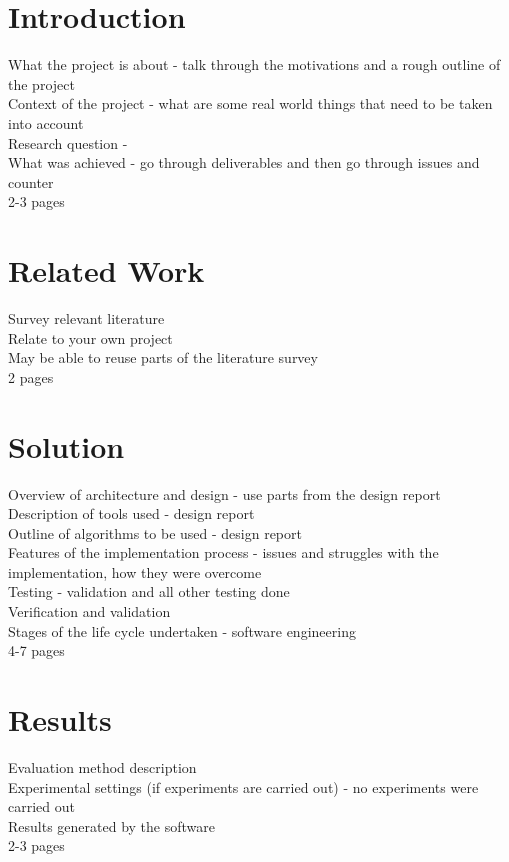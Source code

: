 \documentclass[12pt,a4paper]{article}
\begin{document}
\section{Introduction}

What the project is about - talk through the motivations and a rough outline of the project\\
Context of the project - what are some real world things that need to be taken into account\\
Research question - \\
What was achieved - go through deliverables and then go through issues and counter\\
2-3 pages

\section{Related Work}

Survey relevant literature\\
Relate to your own project\\
May be able to reuse parts of the literature survey\\
2 pages

\section{Solution}

Overview of architecture and design - use parts from the design report\\
Description of tools used - design report\\
Outline of algorithms to be used - design report\\
Features of the implementation process - issues and struggles with the implementation, how they were overcome\\
Testing - validation and all other testing done\\
Verification and validation\\
Stages of the life cycle undertaken - software engineering\\
4-7 pages

\section{Results}

Evaluation method description\\
Experimental settings (if experiments are carried out) - no experiments were carried out\\
Results generated by the software\\
2-3 pages
\end{document}
